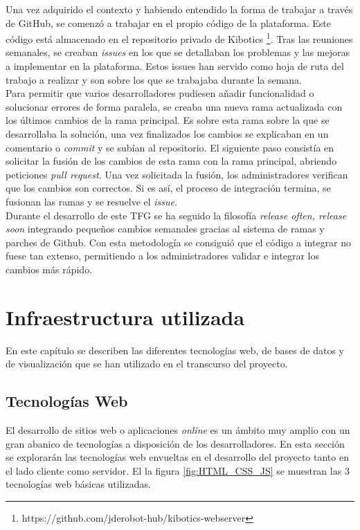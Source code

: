 \documentclass[a4paper, 12pt]{book}
\begin{document}
		Una vez adquirido el contexto y habiendo entendido la forma de trabajar a través de GitHub, se comenzó a trabajar en el propio código de la plataforma. Este código está almacenado en el repositorio privado de Kibotics \footnote{https://github.com/jderobot-hub/kibotics-webserver}. Tras las reuniones semanales, se creaban \textit{issues} en los que se detallaban los problemas y las mejoras a implementar en la plataforma. Estos issues han servido como hoja de ruta del trabajo a realizar y son sobre los que se trabajaba durante la semana. \\
		
		Para permitir que varios desarrolladores pudiesen añadir funcionalidad o solucionar errores de forma paralela, se creaba una nueva rama actualizada con los últimos cambios de la rama principal. Es sobre esta rama sobre la que se desarrollaba la solución, una vez finalizados los cambios se explicaban en un comentario o \textit{commit} y se subían al repositorio. El siguiente paso consistía en solicitar la fusión de los cambios de esta rama con la rama principal, abriendo peticiones \textit{pull request}. Una vez solicitada la fusión, los administradores verifican que los cambios son correctos. Si es así, el proceso de integración termina, se fusionan las ramas y se resuelve el \textit{issue}. \\
		
		Durante el desarrollo de este TFG se ha seguido la filosofía \textit{release often, release soon} integrando pequeños cambios semanales gracias al sistema de ramas y parches de Github. Con esta metodología se consiguió que el código a integrar no fuese tan extenso, permitiendo a los administradores validar e integrar los cambios más rápido.
		
		
	\cleardoublepage 
	\chapter{Infraestructura utilizada} 
	\label{chap:infraestructura_utilizada} 
		En este capítulo se describen las diferentes tecnologías web, de bases de datos y de visualización que se han utilizado en el transcurso del proyecto.
		
	\section{Tecnologías Web} 
	\label{sec:tecnologias_web} 
		El desarrollo de sitios web o aplicaciones \textit{online} es un ámbito muy amplio con un gran abanico de tecnologías a disposición de los desarrolladores. En esta sección se explorarán las tecnologías web envueltas en el desarrollo del proyecto tanto en el lado cliente como servidor. El la figura \ref{fig:HTML_CSS_JS} se muestran las 3 tecnologías web básicas utilizadas.
		
\end{document}
